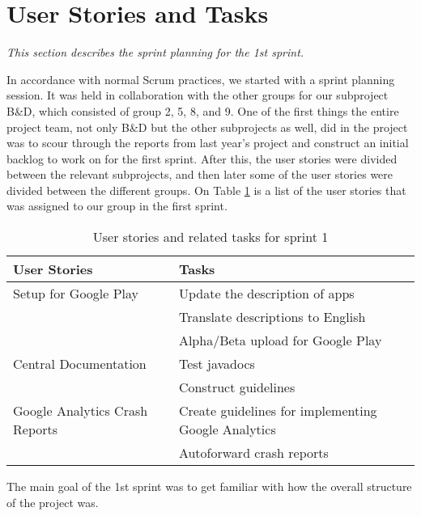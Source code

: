 \section{User Stories and Tasks} \label{Sprint1_SecUserStoriesAndTasks}
\textit{This section describes the sprint planning for the 1st sprint.}

In accordance with normal Scrum practices, we started with a sprint planning session. It was held in collaboration with the other groups for our subproject B\&D, which consisted of group 2, 5, 8, and 9. One of the first things the entire project team, not only B\&D but the other subprojects as well, did in the project was to scour through the reports from last year's project and construct an initial backlog to work on for the first sprint.
After this, the user stories were divided between the relevant subprojects, and then later some of the user stories were divided between the different groups. On Table \ref{Sprint1_UserStories2_table} is a list of the user stories that was assigned to our group in the first sprint.

\begin{table}[H]
	\centering
	\begin{tabular}{ll}
		\textbf{User Stories} & \textbf{Tasks}\\ \hline \noalign{\vskip 2mm}
		Setup for Google Play & Update the description of apps\\
		& Translate descriptions to English\\
		& Alpha/Beta upload for Google Play\\ \hline
		Central Documentation & Test javadocs\\
		& Construct guidelines\\ \hline
		Google Analytics Crash Reports & Create guidelines for implementing Google Analytics\\
		& Autoforward crash reports\\ \hline
	\end{tabular}
	\caption{User stories and related tasks for sprint 1}
	\label{Sprint1_UserStories2_table}
\end{table}

The main goal of the 1st sprint was to get familiar with how the overall structure of the project was.
\newpage